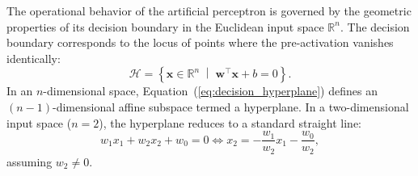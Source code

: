 \documentclass[../../main.tex]{subfiles}
\begin{document}
The operational behavior of the artificial perceptron is governed by the geometric properties of its decision boundary in the Euclidean input space $\mathbb{R}^n$. The decision boundary corresponds to the locus of points where the pre-activation vanishes identically:
\begin{equation}
\mathcal{H} = \left\{ \mathbf{x} \in \mathbb{R}^n \;\middle|\; \mathbf{w}^\top \mathbf{x} + b = 0 \right\}.
\label{eq:decision_hyperplane}
\end{equation}
In an $n$-dimensional space, Equation~(\ref{eq:decision_hyperplane}) defines an $(n-1)$-dimensional affine subspace termed a hyperplane. In a two-dimensional input space ($n = 2$), the hyperplane reduces to a standard straight line:
\begin{equation}
w_1 x_1 + w_2 x_2 + w_0 = 0 \iff x_2 = -\frac{w_1}{w_2} x_1 - \frac{w_0}{w_2},
\end{equation}
assuming $w_2 \neq 0$.
\end{document}

